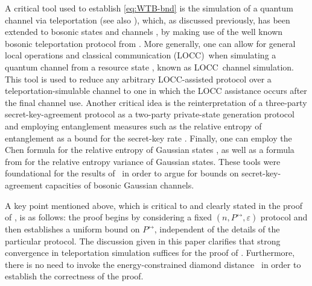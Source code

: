 \documentclass[apsrev,twocolumn]{revtex4-1}%
\begin{document}
A critical tool used to establish \eqref{eq:WTB-bnd} is the simulation of a
quantum channel via teleportation \cite[Section~V]{BDSW96} (see also
\cite[Theorem 14 \&\ Remark~11]{Mul12}), which, as discussed previously, has
been extended to bosonic states and channels \cite{NFC09,WPG07}, by making use
of the well known bosonic teleportation protocol from \cite{prl1998braunstein}%
. More generally, one can allow for general local operations and classical
communication (LOCC)\ when simulating a quantum channel from a resource state
\cite[Eq.~(11)]{HHH99}, known as LOCC\ channel simulation. This tool is used
to reduce any arbitrary LOCC-assisted protocol over a teleportation-simulable
channel to one in which the LOCC assistance occurs after the final channel
use. Another critical idea is the reinterpretation of a three-party
secret-key-agreement protocol as a two-party private-state generation protocol
and employing entanglement measures such as the relative entropy of
entanglement as a bound for the secret-key rate \cite{HHHO05,HHHO09}. Finally,
one can employ the Chen formula for the relative entropy of Gaussian states
\cite{PhysRevA.71.062320}, as well as a formula from \cite{WTLB16} for the
relative entropy variance of Gaussian states. These tools were foundational
for the results of  \cite[Theorem~24]{WTB16}\ in order to
argue for bounds on secret-key-agreement capacities of bosonic Gaussian channels.

A key point mentioned above, which is critical to and clearly stated in the
proof of \cite[Theorem~24]{WTB16}, is as follows: the proof begins by
considering a fixed $(n,P^{\leftrightarrow},\varepsilon)$ protocol and then
establishes a uniform bound on $P^{\leftrightarrow}$, independent of the
details of the particular protocol.
The discussion given in this paper clarifies that strong convergence in
teleportation simulation suffices for the proof of \cite[Theorem~24]{WTB16}. Furthermore,
 there is no need to invoke the energy-constrained diamond distance
\cite{Sh17,Win17}\ in order to establish the correctness of the proof.
\end{document}
